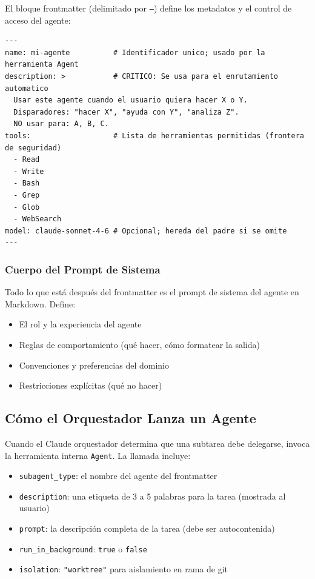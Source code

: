 \documentclass[11pt,letterpaper]{article}
\begin{document}
El bloque frontmatter (delimitado por \texttt{---}) define los metadatos y el control de acceso del agente:

\begin{lstlisting}[style=MarkdownStyle, caption={Campos del frontmatter de un agente}]
---
name: mi-agente          # Identificador unico; usado por la herramienta Agent
description: >           # CRITICO: Se usa para el enrutamiento automatico
  Usar este agente cuando el usuario quiera hacer X o Y.
  Disparadores: "hacer X", "ayuda con Y", "analiza Z".
  NO usar para: A, B, C.
tools:                   # Lista de herramientas permitidas (frontera de seguridad)
  - Read
  - Write
  - Bash
  - Grep
  - Glob
  - WebSearch
model: claude-sonnet-4-6 # Opcional; hereda del padre si se omite
---
\end{lstlisting}

\subsubsection{Cuerpo del Prompt de Sistema}

Todo lo que está después del frontmatter es el prompt de sistema del agente en Markdown. Define:
\begin{itemize}[leftmargin=*]
    \item El rol y la experiencia del agente
    \item Reglas de comportamiento (qué hacer, cómo formatear la salida)
    \item Convenciones y preferencias del dominio
    \item Restricciones explícitas (qué no hacer)
\end{itemize}

\subsection{Cómo el Orquestador Lanza un Agente}

Cuando el Claude orquestador determina que una subtarea debe delegarse, invoca la herramienta interna \texttt{Agent}. La llamada incluye:

\begin{itemize}[leftmargin=*]
    \item \texttt{subagent\_type}: el nombre del agente del frontmatter
    \item \texttt{description}: una etiqueta de 3 a 5 palabras para la tarea (mostrada al usuario)
    \item \texttt{prompt}: la descripción completa de la tarea (debe ser autocontenida)
    \item \texttt{run\_in\_background}: \texttt{true} o \texttt{false}
    \item \texttt{isolation}: \texttt{"worktree"} para aislamiento en rama de git
\end{itemize}
\end{document}

